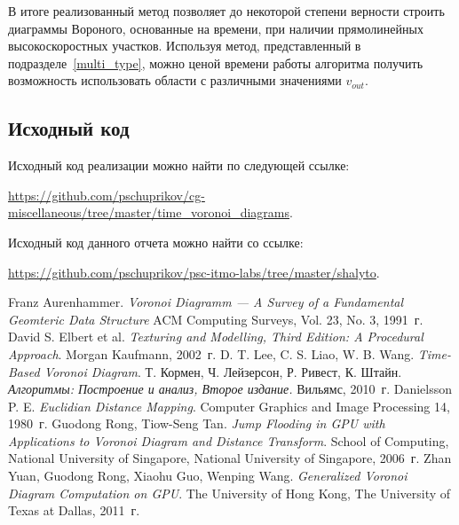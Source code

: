 \documentclass[12pt]{article}
\begin{document}
В итоге реализованный метод позволяет до некоторой степени верности строить
диаграммы Вороного, основанные на времени, при наличии 
прямолинейных высокоскоростных участков. Используя метод, 
представленный в подразделе~\ref{multi_type}, можно ценой времени работы
алгоритма получить возможность использовать области с различными 
значениями $v_{out}$.
\pagebreak

\begin{appendix}
\section{Исходный код}
\label{source}
Исходный код реализации можно найти по следующей ссылке: 

\url{https://github.com/pschuprikov/cg-miscellaneous/tree/master/time_voronoi_diagrams}.

Исходный код данного отчета можно найти со ссылке:

\url{https://github.com/pschuprikov/psc-itmo-labs/tree/master/shalyto}.

\end{appendix}

\begin{thebibliography}{10}
 Franz Aurenhammer. \textit{Voronoi Diagramm --- A Survey of a Fundamental Geomteric Data Structure} 
ACM Computing Surveys, Vol. 23, No. 3, 1991~г.
 David S. Elbert et al. \textit{Texturing and Modelling, Third Edition: A Procedural Approach}. 
Morgan Kaufmann, 2002~г.
 D. T. Lee, C. S. Liao, W. B. Wang. \textit{Time-Based Voronoi Diagram}.
 Т. Кормен, Ч. Лейзерсон, Р. Ривест, К. Штайн. \textit{Алгоритмы:
Построение и анализ, Второе издание.} Вильямс, 2010~г.
 Danielsson P. E. \textit{Euclidian Distance Mapping}. Computer Graphics and Image Processing 14, 1980~г.
 Guodong Rong, Tiow-Seng Tan. \textit{Jump Flooding in GPU with Applications to Voronoi Diagram and Distance Transform}. School of Computing, 
National University of Singapore, National University of Singapore, 2006~г. 
 Zhan Yuan, Guodong Rong, Xiaohu Guo, Wenping Wang. \textit{Generalized Voronoi Diagram Computation on GPU}. The University of Hong Kong, The University of Texas at Dallas, 2011~г.
\end{thebibliography}
\end{document}
